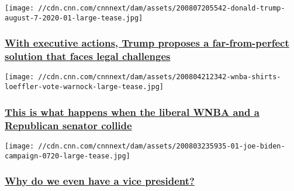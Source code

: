 \href{/2020/08/08/politics/trump-democrats-stimulus-talks-stalled/index.html}{}

\texttt{[image: //cdn.cnn.com/cnnnext/dam/assets/200807205542-donald-trump-august-7-2020-01-large-tease.jpg]}

\hypertarget{with-executive-actions-trump-proposes-a-far-from-perfect-solution-that-faces-legal-challenges}{%
\subsubsection{\texorpdfstring{\href{/2020/08/08/politics/trump-democrats-stimulus-talks-stalled/index.html}{With
executive actions, Trump proposes a far-from-perfect solution that faces
legal
challenges}}{With executive actions, Trump proposes a far-from-perfect solution that faces legal challenges}}\label{with-executive-actions-trump-proposes-a-far-from-perfect-solution-that-faces-legal-challenges}}

\href{/2020/08/08/politics/wnba-kelly-loeffler-analysis/index.html}{}

\texttt{[image: //cdn.cnn.com/cnnnext/dam/assets/200804212342-wnba-shirts-loeffler-vote-warnock-large-tease.jpg]}

\hypertarget{this-is-what-happens-when-the-liberal-wnba-and-a-republican-senator-collide}{%
\subsubsection{\texorpdfstring{\href{/2020/08/08/politics/wnba-kelly-loeffler-analysis/index.html}{This
is what happens when the liberal WNBA and a Republican senator
collide}}{This is what happens when the liberal WNBA and a Republican senator collide}}\label{this-is-what-happens-when-the-liberal-wnba-and-a-republican-senator-collide}}

\href{/2020/08/08/politics/what-matters-august-7/index.html}{}

\texttt{[image: //cdn.cnn.com/cnnnext/dam/assets/200803235935-01-joe-biden-campaign-0720-large-tease.jpg]}

\hypertarget{why-do-we-even-have-a-vice-president}{%
\subsubsection{\texorpdfstring{\href{/2020/08/08/politics/what-matters-august-7/index.html}{Why
do we even have a vice
president?}}{Why do we even have a vice president?}}\label{why-do-we-even-have-a-vice-president}}

